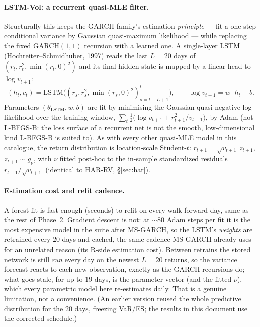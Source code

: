 \documentclass[11pt,a4paper]{article}
\begin{document}
\paragraph{LSTM-Vol: a recurrent quasi-MLE filter.} Structurally this keeps
the GARCH family's estimation \emph{principle} --- fit a one-step conditional
variance by Gaussian quasi-maximum likelihood --- while replacing the fixed
GARCH$(1,1)$ recursion with a learned one. A single-layer LSTM
(Hochreiter--Schmidhuber, 1997) reads the last $L=20$ days of
$(r_t,r_t^2,\min(r_t,0)^2)$ and its final hidden state is mapped by a linear
head to $\log v_{t+1}$:
\begin{equation}
  (h_t,c_t) = \mathrm{LSTM}\big((r_s,r_s^2,\min(r_s,0)^2)_{s=t-L+1}^{t}\big),
  \qquad
  \log v_{t+1} = w^\top h_t + b.
\end{equation}
Parameters $(\theta_{\mathrm{LSTM}},w,b)$ are fit by minimising the Gaussian
quasi-negative-log-likelihood over the training window,
$\sum_t \tfrac12\big(\log v_{t+1} + r_{t+1}^2/v_{t+1}\big)$, by Adam (not
L-BFGS-B: the loss surface of a recurrent net is not the smooth, low-dimensional
kind L-BFGS-B is suited to). As with every other quasi-MLE model in this
catalogue, the return distribution is location-scale Student-$t$:
$r_{t+1}=\sqrt{v_{t+1}}\,z_{t+1}$,
$z_{t+1}\sim g_\nu$, with $\nu$ fitted post-hoc to the in-sample standardized
residuals $r_{t+1}/\sqrt{v_{t+1}}$ (identical to HAR-RV, \S\ref{sec:har}).

\paragraph{Estimation cost and refit cadence.} A forest fit is fast enough
(seconds) to refit on every walk-forward day, same as the rest of Phase~2.
Gradient descent is not: at $\sim 80$ Adam steps per fit it is the most
expensive model in the suite after MS-GARCH, so the LSTM's \emph{weights} are
retrained every $20$ days and cached, the same cadence MS-GARCH already uses
for an unrelated reason (its R-side estimation cost). Between retrains the
stored network is still \emph{run} every day on the newest $L=20$ returns, so
the variance forecast reacts to each new observation, exactly as the GARCH
recursions do; what goes stale, for up to $19$ days, is the parameter vector
(and the fitted $\nu$), which every parametric model here re-estimates daily.
That is a genuine limitation, not a convenience. (An earlier version reused the
whole predictive distribution for the $20$ days, freezing VaR/ES; the results
in this document use the corrected schedule.)
\end{document}
